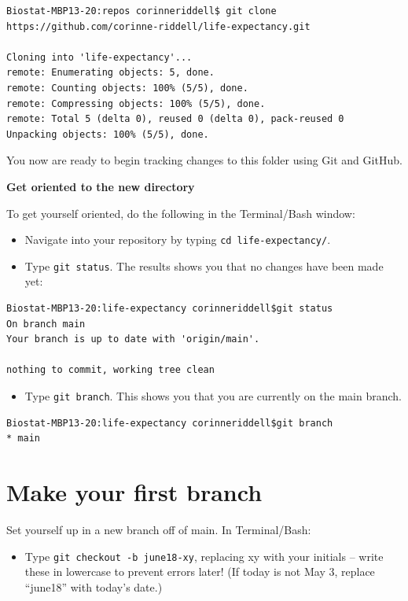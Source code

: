 \documentclass[
]{book}
\providecommand{\tightlist}{%
  \setlength{\itemsep}{0pt}\setlength{\parskip}{0pt}}
\begin{document}
\begin{verbatim}
Biostat-MBP13-20:repos corinneriddell$ git clone https://github.com/corinne-riddell/life-expectancy.git

Cloning into 'life-expectancy'...
remote: Enumerating objects: 5, done.
remote: Counting objects: 100% (5/5), done.
remote: Compressing objects: 100% (5/5), done.
remote: Total 5 (delta 0), reused 0 (delta 0), pack-reused 0
Unpacking objects: 100% (5/5), done.
\end{verbatim}

You now are ready to begin tracking changes to this folder using Git and GitHub.

\textbf{Get oriented to the new directory}

To get yourself oriented, do the following in the Terminal/Bash window:

\begin{itemize}
\tightlist
\item
  Navigate into your repository by typing \texttt{cd\ life-expectancy/}.
\item
  Type \texttt{git\ status}. The results shows you that no changes have been made yet:
\end{itemize}

\begin{verbatim}
Biostat-MBP13-20:life-expectancy corinneriddell$git status
On branch main
Your branch is up to date with 'origin/main'.

nothing to commit, working tree clean
\end{verbatim}

\begin{itemize}
\tightlist
\item
  Type \texttt{git\ branch}. This shows you that you are currently on the main branch.
\end{itemize}

\begin{verbatim}
Biostat-MBP13-20:life-expectancy corinneriddell$git branch
* main
\end{verbatim}

\section{Make your first branch}\label{make-your-first-branch}

Set yourself up in a new branch off of main. In Terminal/Bash:

\begin{itemize}
\tightlist
\item
  Type \texttt{git\ checkout\ -b\ june18-xy}, replacing xy with your initials -- write these
  in lowercase to prevent errors later! (If today is not May 3, replace ``june18''
  with today's date.)
\end{itemize}
\end{document}
